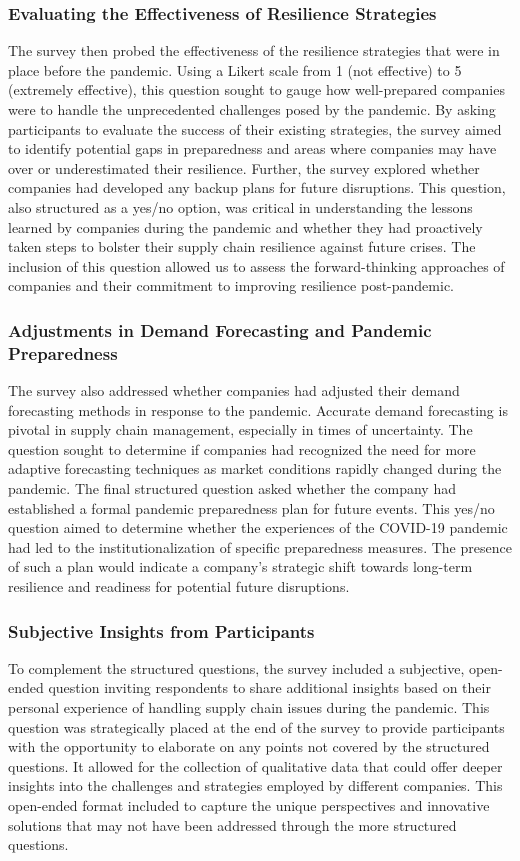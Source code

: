 \subsubsection*{Evaluating the Effectiveness of Resilience Strategies}
The survey then probed the effectiveness of the resilience strategies that were in place before the pandemic. Using a Likert scale from 1 (not effective) to 5 (extremely effective), this question sought to gauge how well-prepared companies were to handle the unprecedented challenges posed by the pandemic. By asking participants to evaluate the success of their existing strategies, the survey aimed to identify potential gaps in preparedness and areas where companies may have over or underestimated their resilience. Further, the survey explored whether companies had developed any backup plans for future disruptions. This question, also structured as a yes/no option, was critical in understanding the lessons learned by companies during the pandemic and whether they had proactively taken steps to bolster their supply chain resilience against future crises. The inclusion of this question allowed us to assess the forward-thinking approaches of companies and their commitment to improving resilience post-pandemic.

\subsubsection*{Adjustments in Demand Forecasting and Pandemic Preparedness}
The survey also addressed whether companies had adjusted their demand forecasting methods in response to the pandemic. Accurate demand forecasting is pivotal in supply chain management, especially in times of uncertainty. The question sought to determine if companies had recognized the need for more adaptive forecasting techniques as market conditions rapidly changed during the pandemic. The final structured question asked whether the company had established a formal pandemic preparedness plan for future events. This yes/no question aimed to determine whether the experiences of the COVID-19 pandemic had led to the institutionalization of specific preparedness measures. The presence of such a plan would indicate a company’s strategic shift towards long-term resilience and readiness for potential future disruptions.

\subsubsection*{Subjective Insights from Participants}
To complement the structured questions, the survey included a subjective, open-ended question inviting respondents to share additional insights based on their personal experience of handling supply chain issues during the pandemic. This question was strategically placed at the end of the survey to provide participants with the opportunity to elaborate on any points not covered by the structured questions. It allowed for the collection of qualitative data that could offer deeper insights into the challenges and strategies employed by different companies. This open-ended format included to capture the unique perspectives and innovative solutions that may not have been addressed through the more structured questions.

